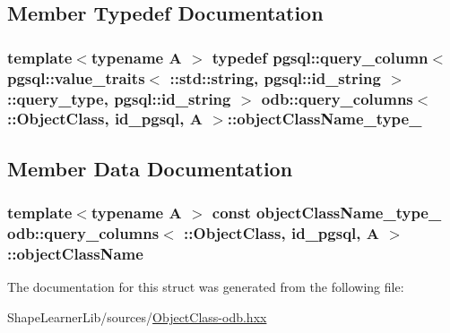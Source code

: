 \subsection{Member Typedef Documentation}
\hypertarget{structodb_1_1query__columns_3_01_1_1_object_class_00_01id__pgsql_00_01_a_01_4_a3e73103db9fee7bc5103f0a6f89e9821}{}
\subsubsection[{object\+Class\+Name\+\_\+type\+\_\+}]{\setlength{\rightskip}{0pt plus 5cm}template$<$typename A $>$ typedef pgsql\+::query\+\_\+column$<$ pgsql\+::value\+\_\+traits$<$ \+::std\+::string, pgsql\+::id\+\_\+string $>$\+::query\+\_\+type, pgsql\+::id\+\_\+string $>$ odb\+::query\+\_\+columns$<$ \+::{\bf Object\+Class}, id\+\_\+pgsql, A $>$\+::{\bf object\+Class\+Name\+\_\+type\+\_\+}}\label{structodb_1_1query__columns_3_01_1_1_object_class_00_01id__pgsql_00_01_a_01_4_a3e73103db9fee7bc5103f0a6f89e9821}


\subsection{Member Data Documentation}
\hypertarget{structodb_1_1query__columns_3_01_1_1_object_class_00_01id__pgsql_00_01_a_01_4_a448f56b77cf6c487660b8870ec5fdab5}{}
\subsubsection[{object\+Class\+Name}]{\setlength{\rightskip}{0pt plus 5cm}template$<$typename A $>$ const {\bf object\+Class\+Name\+\_\+type\+\_\+} odb\+::query\+\_\+columns$<$ \+::{\bf Object\+Class}, id\+\_\+pgsql, A $>$\+::object\+Class\+Name\hspace{0.3cm}{\ttfamily [static]}}\label{structodb_1_1query__columns_3_01_1_1_object_class_00_01id__pgsql_00_01_a_01_4_a448f56b77cf6c487660b8870ec5fdab5}


The documentation for this struct was generated from the following file\+:\begin{DoxyCompactItemize}
\item 
Shape\+Learner\+Lib/sources/\hyperlink{_object_class-odb_8hxx}{Object\+Class-\/odb.\+hxx}\end{DoxyCompactItemize}
